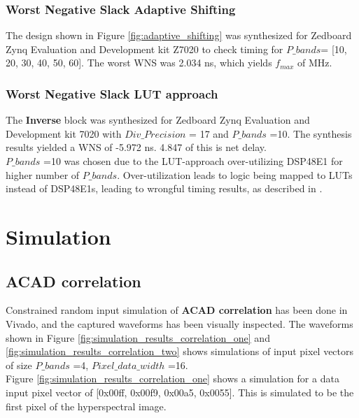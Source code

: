 \subsubsection{Worst Negative Slack Adaptive Shifting}
 The design shown in Figure \ref{fig:adaptive_shifting} was synthesized for Zedboard Zynq Evaluation and Development kit Z7020 to check timing for $P\_bands$= [10, 20, 30, 40, 50, 60]. The worst WNS was 2.034 ns, which yields $f_{max}$ of  MHz. 
 
 
 
 \subsubsection{Worst Negative Slack LUT approach}
 The \textbf{Inverse} block was synthesized for Zedboard Zynq Evaluation and Development kit 7020 with $Div\_Precision$ = 17 and $P\_bands$ =10. The synthesis results yielded a WNS of -5.972 ns. 4.847 of this is net delay. \\
 
$P\_bands$ =10 was chosen due to the LUT-approach over-utilizing DSP48E1 for higher number of $P\_bands$. Over-utilization leads to logic being mapped to LUTs instead of DSP48E1s, leading to wrongful timing results, as described in \cite{cite:dsp_overutilizing}. 
 
 
 \section{Simulation}
 
 \subsection{ACAD correlation}

 Constrained random input simulation of \textbf{ACAD correlation} has been done in Vivado, and the captured waveforms has been visually inspected. The waveforms shown in Figure \ref{fig:simulation_results_correlation_one} and \ref{fig:simulation_results_correlation_two} shows simulations of input pixel vectors of size $P\_bands$ =4, $Pixel\_data\_width$ =16.\\
 
 Figure \ref{fig:simulation_results_correlation_one} shows a simulation for a data input pixel vector of [0x00ff, 0x00f9, 0x00a5, 0x0055]. This is simulated to be the first pixel of the hyperspectral image.\\
 
